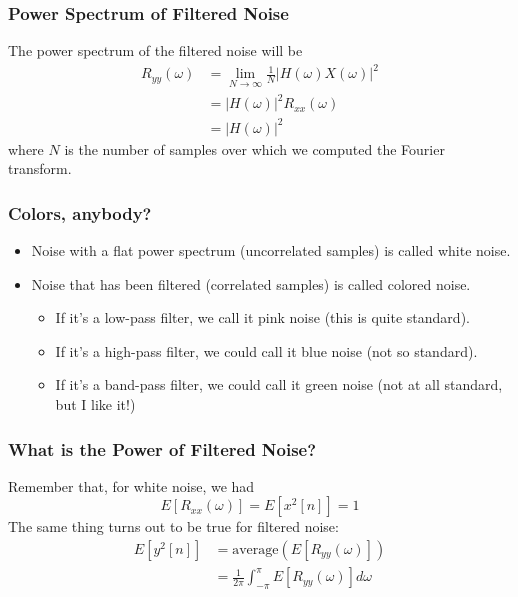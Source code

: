 \documentclass{beamer}
\begin{document}
\begin{frame}
  \frametitle{Power Spectrum of Filtered Noise}

  The power spectrum of the filtered noise will be
  \begin{align*}
    R_{yy}(\omega) &= \lim_{N\rightarrow\infty} \frac{1}{N} |H(\omega)X(\omega)|^2\\
    &= |H(\omega)|^2 R_{xx}(\omega)\\
    &= |H(\omega)|^2
  \end{align*}
  where $N$ is the number of samples over which we computed the Fourier transform.
\end{frame}

\begin{frame}
  \frametitle{Colors, anybody?}

  \begin{itemize}
    \item Noise with a flat power spectrum (uncorrelated samples) is
      called white noise.
    \item Noise that has been filtered (correlated samples) is called
      colored noise.
      \begin{itemize}
      \item If it's a low-pass filter, we call it pink noise (this is
        quite standard).
      \item If it's a high-pass filter, we could call it blue noise
        (not so standard).
      \item If it's a band-pass filter, we could call it green noise
        (not at all standard, but I like it!)
      \end{itemize}
  \end{itemize}
\end{frame}

\begin{frame}
  \frametitle{What is the Power of Filtered Noise?}

  Remember that, for white noise, we had
  \begin{displaymath}
    E\left[R_{xx}(\omega)\right] = E[x^2[n]]=1
  \end{displaymath}
  The same thing turns out to be true for filtered noise:
  \begin{align*}
    E\left[y^2[n]\right] &= \mbox{average}\left(E\left[R_{yy}(\omega)\right]\right)\\
    &= \frac{1}{2\pi}\int_{-\pi}^\pi E\left[R_{yy}(\omega)\right]d\omega
  \end{align*}
\end{frame}
\end{document}
